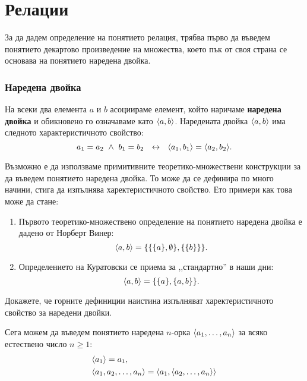 \chapter{Релации}

За да дадем определение на понятието релация, трябва първо 
да въведем понятието декартово произведение на множества,
което пък от своя страна се основава на понятието наредена двойка.

\subsection*{Наредена двойка}
На всеки два елемента $a$ и $b$ асоциираме  елемент, който наричаме {\bf наредена двойка} и обикновено го означаваме като $\langle{a,b}\rangle$.
Наредената двойка $\langle{a,b}\rangle$ има следното характеристичното свойство:
\[a_1 = a_2\ \wedge\ b_1 = b_2\ \iff\ \pair{a_1,b_1} = \pair{a_2,b_2}.\]

\begin{remark}
  Възможно е да използваме примитивните теоретико-множествени конструкции за да въведем понятието наредена двойка.
  То може да се дефинира по много начини, стига да изпълнява харектеристичното свойство.
  Ето примери как това може да стане:
  \begin{enumerate}[1)]
  \item
    Първото теоретико-множествено определение на понятието наредена двойка е
    дадено от Норберт Винер:
    \[\langle{a,b}\rangle = \{\{\{a\},\emptyset\},\{\{b\}\}\}.\]
  \item
    Определението на Куратовски се приема за ,,стандартно'' в наши дни:
    \[\langle{a,b}\rangle = \{\{a\},\{a,b\}\}.\]
  \end{enumerate}
\end{remark}

\begin{problem}
  Докажете, че горните дефиниции наистина изпълняват харектеристичното свойство за наредени двойки.
\end{problem}

Сега можем да въведем понятието наредена $n$-орка $\langle{a_1,\dots,a_n}\rangle$ за всяко естествено число $n \geq 1$:
\begin{align*}
  & \langle{a_1}\rangle = a_1,\\
  & \langle{a_1,a_2,\dots,a_n}\rangle = \langle{a_1,\langle{a_2,\dots,a_n}\rangle}\rangle
\end{align*}

